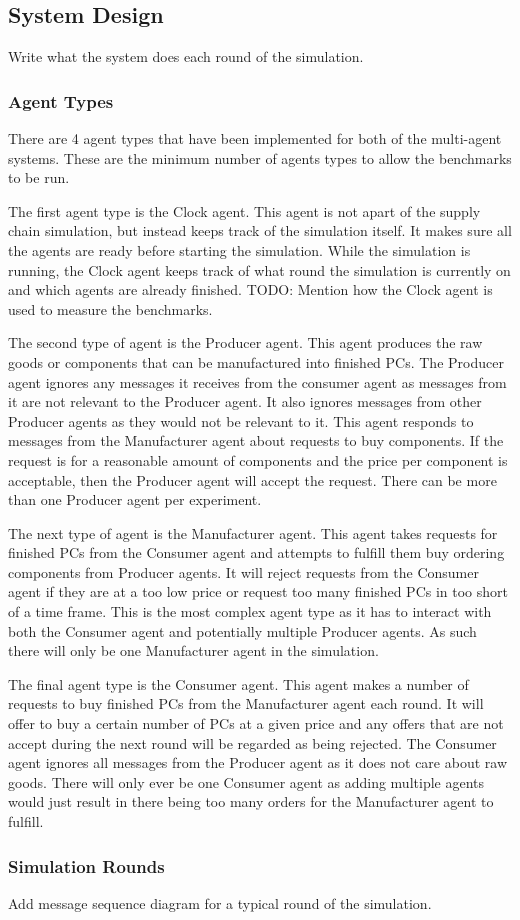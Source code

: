 \subsection{System Design}

Write what the system does each round of the simulation.

\subsubsection{Agent Types}

There are 4 agent types that have been implemented for both of the multi-agent systems.
These are the minimum number of agents types to allow the benchmarks to be run.

The first agent type is the Clock agent.
This agent is not apart of the supply chain simulation, but instead keeps track of the simulation itself.
It makes sure all the agents are ready before starting the simulation.
While the simulation is running, the Clock agent keeps track of what round the simulation is currently on and which agents are already finished.
TODO\@: Mention how the Clock agent is used to measure the benchmarks.

The second type of agent is the Producer agent.
This agent produces the raw goods or components that can be manufactured into finished PCs.
The Producer agent ignores any messages it receives from the consumer agent as messages from it are not relevant to the Producer agent.
It also ignores messages from other Producer agents as they would not be relevant to it.
This agent responds to messages from the Manufacturer agent about requests to buy components.
If the request is for a reasonable amount of components and the price per component is acceptable, then the Producer agent will accept the request.
There can be more than one Producer agent per experiment.

The next type of agent is the Manufacturer agent.
This agent takes requests for finished PCs from the Consumer agent and attempts to fulfill them buy ordering components from Producer agents.
It will reject requests from the Consumer agent if they are at a too low price or request too many finished PCs in too short of a time frame.
This is the most complex agent type as it has to interact with both the Consumer agent and potentially multiple Producer agents.
As such there will only be one Manufacturer agent in the simulation.

The final agent type is the Consumer agent.
This agent makes a number of requests to buy finished PCs from the Manufacturer agent each round.
It will offer to buy a certain number of PCs at a given price and any offers that are not accept during the next round will be regarded as being rejected.
The Consumer agent ignores all messages from the Producer agent as it does not care about raw goods.
There will only ever be one Consumer agent as adding multiple agents would just result in there being too many orders for the Manufacturer agent to fulfill.

\subsubsection{Simulation Rounds}

Add message sequence diagram for a typical round of the simulation.
